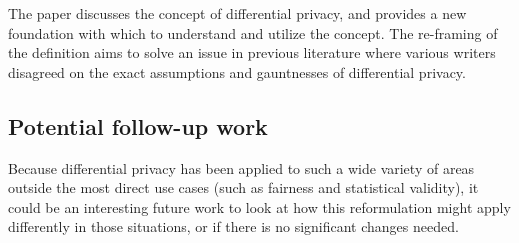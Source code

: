 \documentclass[11pt]{article}
\begin{document}
The paper discusses the concept of differential privacy, and provides a new foundation with which to understand and utilize the concept.
The re-framing of the definition aims to solve an issue in previous literature where various writers disagreed on the exact assumptions and gauntnesses of differential privacy.

\subsection*{Potential follow-up work}

Because differential privacy has been applied to such a wide variety of areas outside the most direct use cases (such as fairness and statistical validity), it could be an interesting future work to look at how this reformulation might apply differently in those situations, or if there is no significant changes needed. 
\end{document}
